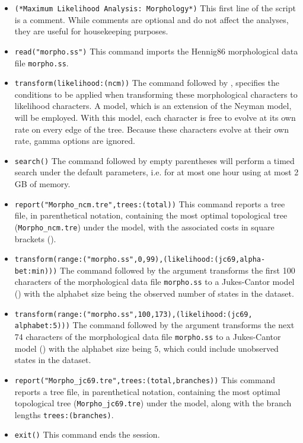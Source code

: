\begin{itemize}
\item \texttt{(*Maximum Likelihood Analysis: Morphology*)} This
first line of the script is a comment.  While comments are optional
and do not affect the analyses, they are useful for housekeeping
purposes.  
\item \texttt{read("morpho.ss")} This command imports
the Hennig86 morphological data file \texttt{morpho.ss}.  
\item \texttt{transform(likelihood:(ncm))} The 
command followed by , specifies the
conditions to be applied when transforming these morphological
characters to likelihood characters. A  model,
which is an extension of the Neyman model, will be employed.  With
this model, each character is free to evolve at its own rate on
every edge of the tree. Because these characters evolve at their
own rate, gamma options are ignored.  
\item \texttt{search()} The  command followed 
by empty parentheses will perform a timed search under the default 
parameters, i.e. for at most one hour using at most 2 GB of memory.  
\item \texttt{report("Morpho\_ncm.tre",trees:(total))} This command reports
a tree file, in parenthetical notation,  containing the most optimal
topological tree (\texttt{Morpho\_ncm.tre}) under the 
model, with the associated costs in square brackets ().
\item \texttt{transform(range:("morpho.ss",0,99),(likelihood:(jc69,alpha-\\bet:min)))}
The  command followed by the 
argument transforms the first 100 characters of the morphological
data file \texttt{morpho.ss} to a Jukes-Cantor model ()
with the alphabet size being the observed number of states in the
dataset. 
\item \texttt{transform(range:("morpho.ss",100,173),(likelihood:(jc69,\\alphabet:5)))}
The  command followed by the 
argument transforms the next 74 characters of the morphological
data file \texttt{morpho.ss} to a Jukes-Cantor model ()
with the alphabet size being $5$, which could include unobserved
states in the dataset.  
\item \texttt{report("Morpho\_jc69.tre",trees:(total,branches))} This
command reports a tree file, in parenthetical notation, containing
the most optimal topological tree (\texttt{Morpho\_jc69.tre}) under
the  model, along with the branch lengths
\texttt{trees:(branches)}. 
\item \texttt{exit()} This command ends the \poy session.
\end{itemize}

